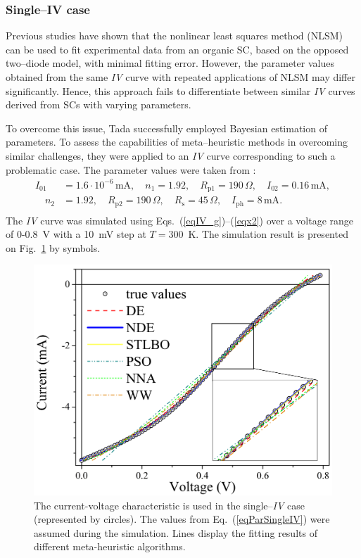 \documentclass[a4paper,fleqn]{cas-sc}
\begin{document}
\subsubsection{Single--IV case}\label{SingleIV}

Previous studies \cite{Tada2015Organic,Tada2021} have shown that the nonlinear least squares method (NLSM) can be used to fit experimental data from an organic SC,
based on the opposed two--diode model, with minimal fitting error.
However, the parameter values obtained from the same \emph{IV} curve with repeated applications of NLSM may differ significantly.
Hence, this approach fails to differentiate between similar \emph{IV} curves derived from SCs with varying parameters.

To overcome this issue, Tada \cite{Tada2021} successfully employed Bayesian estimation of parameters.
To assess the capabilities of meta--heuristic methods in overcoming similar challenges,
they were applied to an \emph{IV} curve corresponding to such a problematic case.
The parameter values were taken from \cite{Tada2021}:
\begin{equation}
\label{eqParSingleIV}
\begin{split}
I_{01}&=1.6\cdot10^{-6}\,\text{mA},\quad n_1=1.92,\quad R_\mathrm{p1}=190\,\Omega,\quad I_{02}=0.16\,\text{mA},\\
\quad n_2&=1.92, \quad R_\mathrm{p2}=190\,\Omega,\quad R_\mathrm{s}=45\,\Omega,\quad I_\mathrm{ph}=8\,\text{mA}.\\
\end{split}
\end{equation}
The \emph{IV} curve was simulated using Eqs.~(\ref{eqIV_g})--(\ref{eqx2}) over a voltage range of 0-0.8~V with a 10~mV step at $T=300$~K.
The simulation result is presented on Fig.~\ref{figSigleIV} by symbols.

\begin{figure}[]
	\centering
		\includegraphics[width=0.5\columnwidth]{Fig2}
	  \caption{The current-voltage characteristic is used in the single--\emph{IV} case (represented by circles).
        The values from Eq.~(\ref{eqParSingleIV}) were assumed during the simulation.
        Lines display the fitting results of different meta-heuristic algorithms.
        }\label{figSigleIV}
\end{figure}
\end{document}
